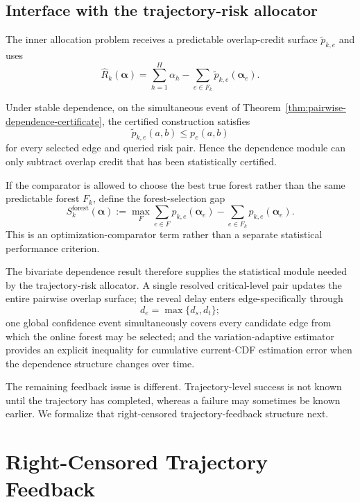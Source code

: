 \documentclass[11pt]{article}
\begin{document}
\subsection{Interface with the trajectory-risk allocator}

The inner allocation problem receives a predictable overlap-credit surface
$\widetilde p_{k,e}$ and uses
\begin{equation}
    \widehat R_k(\bm\alpha)
    =
    \sum_{h=1}^{H}\alpha_h
    -
    \sum_{e\in F_k}
    \widetilde p_{k,e}(\bm\alpha_e).
    \label{eq:dependence-module-risk}
\end{equation}

Under stable dependence, on the simultaneous event of
Theorem~\ref{thm:pairwise-dependence-certificate}, the certified construction
satisfies
\[
    \widetilde p_{k,e}(a,b)
    \le
    p_e(a,b)
\]
for every selected edge and queried risk pair.  Hence the dependence module
can only subtract overlap credit that has been statistically certified.

If the comparator is allowed to choose the best true forest rather than the
same predictable forest $F_k$, define the forest-selection gap
\begin{equation}
    S_k^{\mathrm{forest}}(\bm\alpha)
    :=
    \max_F
    \sum_{e\in F}
    p_{k,e}(\bm\alpha_e)
    -
    \sum_{e\in F_k}
    p_{k,e}(\bm\alpha_e).
    \label{eq:forest-selection-gap}
\end{equation}
This is an optimization-comparator term rather than a separate statistical
performance criterion.

The bivariate dependence result therefore supplies the statistical module
needed by the trajectory-risk allocator.  A single resolved critical-level
pair updates the entire pairwise overlap surface; the reveal delay enters
edge-specifically through
\[
    d_e=\max\{d_s,d_t\};
\]
one global confidence event simultaneously covers every candidate edge from
which the online forest may be selected; and the variation-adaptive estimator
provides an explicit inequality for cumulative current-CDF estimation error
when the dependence structure changes over time.

The remaining feedback issue is different.  Trajectory-level success is not
known until the trajectory has completed, whereas a failure may sometimes be
known earlier.  We formalize that right-censored trajectory-feedback structure
next.
\section{Right-Censored Trajectory Feedback}
\label{sec:right-censored-feedback}
\end{document}
